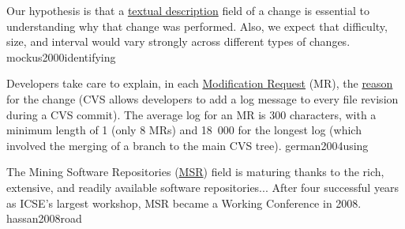 \documentclass{article}
\begin{document}
  {Our hypothesis is that a \ul{textual description} field of a change is essential to understanding why that change was performed. Also, we expect that difficulty, size, and interval would vary strongly across different types of changes.}
  {mockus2000identifying}


  {Developers take care to explain, in each \ul{Modification Request} (MR), the \ul{reason} for the change (CVS allows developers to add a log message to every file revision during a CVS commit). The average log for an MR is 300 characters, with a minimum length of 1 (only 8 MRs) and 18~000 for the longest log (which involved the merging of a branch to the main CVS tree).}
  {german2004using}

  {The Mining Software Repositories (\ul{MSR}) field is maturing thanks to the rich, extensive, and readily available software repositories... After four successful years as ICSE's largest workshop, MSR became a Working Conference in 2008.}
  {hassan2008road}
\end{document}
